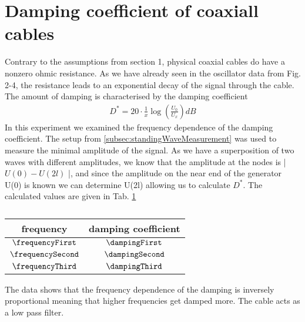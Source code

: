 \documentclass[a4paper,10pt,twocolumn]{article}
\begin{document}
    \section{Damping coefficient of coaxiall cables}\label{sec:dampingCoefficient}
    Contrary to the assumptions from section 1, physical coaxial cables do have a nonzero ohmic resistance.
    As we have already seen in the oscillator data from Fig. 2-4, the resistance leads to an exponential decay of the signal through the cable.
    The amount of damping is characterised by the damping coefficient
    \begin{align}
       D^* = 20\cdot \frac{1}{x}\log(\frac{U_0}{U_x}) dB 
    \end{align}
    In this experiment we examined the frequency dependence of the damping coefficient.
    The setup from \ref{subsec:standingWaveMeasurement} was used to measure the minimal amplitude of the signal.
    As we have a superposition of two waves with different amplitudes, we know that the amplitude at the nodes is | $U(0) - U(2l)$ |, and since the amplitude on the near end of the generator U(0) is known
    we can determine U(2l) allowing us to calculate $D^*$.
    The calculated values are given in Tab. \ref{tab:dampingData}
    \begin{table}
            \centering
            \caption{}
            \label{tab:dampingData}
            \begin{tabular*}{\linewidth}{@{\extracolsep{\fill}}cc}
    \hline  
    \hline
    \rule[-7pt]{0pt}{23pt}  frequency & damping coefficient \\
    \hline
    \rule[-5pt]{0pt}{23pt}  $\frequencyFirst$ & $ \dampingFirst $ \\
    \rule[-5pt]{0pt}{23pt}  $\frequencySecond$ & $ \dampingSecond $ \\
    \rule[-5pt]{0pt}{23pt}  $\frequencyThird$ & $\dampingThird $ \\
    \hline
    \hline   
            \end{tabular*}
        \end{table}
    The data shows that the frequency dependence of the damping is inversely proportional meaning that higher frequencies get damped more.
    The cable acts as a low pass filter.
\end{document}
